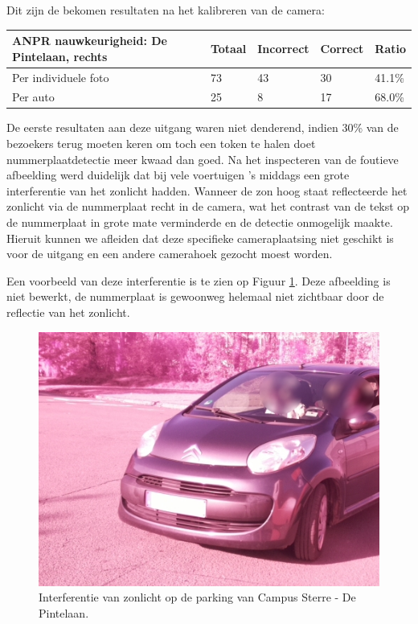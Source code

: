 Dit zijn de bekomen resultaten na het kalibreren van de camera:
\begin{table}[h!]
	\centering
	\begin{tabular}{l|l|l|l|l}
		\textbf{ANPR nauwkeurigheid: De Pintelaan, rechts} & Totaal & Incorrect & Correct & Ratio	\\ \hline
		Per individuele foto 	& 73 & 43	& 30	& 41.1\%\\
		Per auto				& 25 & 8	& 17 	& 68.0\%\\
	\end{tabular}
\end{table}

De eerste resultaten aan deze uitgang waren niet denderend, indien 30\% van de bezoekers terug moeten keren om toch een token te halen doet nummerplaatdetectie meer kwaad dan goed. Na het inspecteren van de foutieve afbeelding werd duidelijk dat bij vele voertuigen 's middags een grote interferentie van het zonlicht hadden. Wanneer de zon hoog staat reflecteerde het zonlicht via de nummerplaat recht in de camera, wat het contrast van de tekst op de nummerplaat in grote mate verminderde en de detectie onmogelijk maakte. Hieruit kunnen we afleiden dat deze specifieke cameraplaatsing niet geschikt is voor de uitgang en een andere camerahoek gezocht moest worden. 

Een voorbeeld van deze interferentie is te zien op Figuur \ref{SterreZonlicht}. Deze afbeelding is niet bewerkt, de nummerplaat is gewoonweg helemaal niet zichtbaar door de reflectie van het zonlicht.
\begin{figure}[h!]
	\centering
	\includegraphics[width=0.8\linewidth]{img/sterre2zon.jpg}
	\caption{Interferentie van zonlicht op de parking van Campus Sterre - De Pintelaan.}
	\label{SterreZonlicht}
\end{figure}

